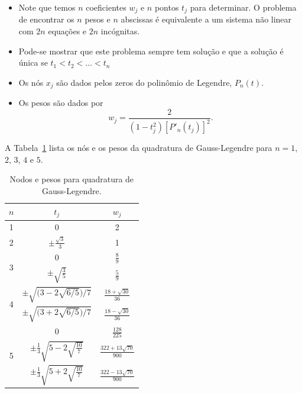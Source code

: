 \begin{itemize}
\item Note que temos $n$ coeficientes $w_j$ e $n$ pontos $t_j$ para determinar. O problema de encontrar os $n$ pesos e $n$ abscissas é equivalente a um sistema não linear com $2n$ equações e $2n$ incógnitas.
\item Pode-se mostrar que este problema sempre tem solução e que a solução é única se $t_1<t_2<\ldots <t_n$
\item Os nós $x_j$ são dados pelos zeros do polinômio de Legendre, $P_n(t)$.
\item Os pesos são dados por
\begin{equation} w_j = \frac{2}{\left( 1-t_j^2 \right) [P'_n(t_j)]^2}. \end{equation}
\end{itemize}

A Tabela~\ref{tab:gauss-legendre} lista os nós e os pesos da quadratura de Gauss-Legendre para $n=1$, $2$, $3$, $4$ e $5$.

\renewcommand{\arraystretch}{2.25}
\begin{table}
  \centering
  \caption{Nodos e pesos para quadratura de Gauss-Legendre.}
  \begin{tabular}{c|cc}
    $n$ & $t_j$ & $w_j$\\[2pt]\hline
    1  & 0 & 2 \\ \hline
    2  & $\displaystyle \pm \frac{\sqrt{3}}{3}$ & 1 \\ \hline
    \multirow{2}{*}{3} &0& $\displaystyle \frac{8}{9}$ \\
        & $\displaystyle \pm \sqrt{\frac{3}{5}}$ & $\displaystyle \frac{5}{9}$ \\\hline
    \multirow{2}{*}{4} & $\displaystyle \pm\sqrt{\Big( 3 - 2\sqrt{6/5} \Big)/7}$ & $\displaystyle \tfrac{18+\sqrt{30}}{36}$\\
        & $\displaystyle \pm\sqrt{\Big( 3 + 2\sqrt{6/5} \Big)/7}$ & $\displaystyle \tfrac{18-\sqrt{30}}{36}$\\\hline
    \multirow{3}{*}{5} & $0$ & $\displaystyle \frac{128}{225}$\\
                       & $\displaystyle \pm\frac{1}{3}\sqrt{5-2\sqrt{\frac{10}{7}}}$ & $\displaystyle \frac{322+13\sqrt{70}}{900}$\\[10pt]
                       & $\displaystyle \pm\frac{1}{3}\sqrt{5+2\sqrt{\frac{10}{7}}}$ & $\displaystyle \frac{322-13\sqrt{70}}{900}$\\[10pt]\hline
\end{tabular}
  \label{tab:gauss-legendre}
\end{table}
\renewcommand{\arraystretch}{1.25}

